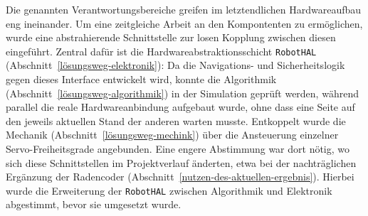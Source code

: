 Die genannten Verantwortungsbereiche greifen im letztendlichen Hardwareaufbau eng ineinander. Um eine zeitgleiche Arbeit an den Kompontenten zu ermöglichen, wurde eine abstrahierende Schnittstelle zur losen Kopplung zwischen diesen eingeführt. Zentral dafür ist die Hardwareabstraktionsschicht \texttt{RobotHAL} (Abschnitt~\ref{lösungsweg-elektronik}): Da die Navigations- und Sicherheitslogik gegen dieses Interface entwickelt wird, konnte die Algorithmik (Abschnitt~\ref{lösungsweg-algorithmik}) in der Simulation geprüft werden, während parallel die reale Hardwareanbindung aufgebaut wurde, ohne dass eine Seite auf den jeweils aktuellen Stand der anderen warten musste. Entkoppelt wurde die Mechanik (Abschnitt~\ref{lösungsweg-mechink}) über die Ansteuerung einzelner Servo-Freiheitsgrade angebunden. Eine engere Abstimmung war dort nötig, wo sich diese Schnittstellen im Projektverlauf änderten, etwa bei der nachträglichen Ergänzung der Radencoder (Abschnitt~\ref{nutzen-des-aktuellen-ergebnis}). Hierbei wurde die Erweiterung der \texttt{RobotHAL} zwischen Algorithmik und Elektronik abgestimmt, bevor sie umgesetzt wurde.

